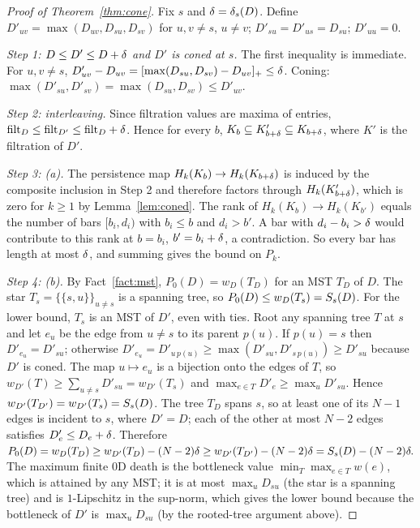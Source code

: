\begin{proof}[Proof of Theorem~\ref{thm:cone}]
Fix $s$ and $\delta=\delta_s(D)$. Define $D'_{uv}=\max(D_{uv},D_{su},D_{sv})$ for $u,v\ne s$, $u\ne v$; $D'_{su}=D'_{us}=D_{su}$; $D'_{uu}=0$.

\emph{Step 1: $D\le D'\le D+\delta$ and $D'$ is coned at $s$.} The first inequality is immediate. For $u,v\ne s$, $D'_{uv}-D_{uv}=[\max(D_{su},D_{sv})-D_{uv}]_+\le\delta$. Coning: $\max(D'_{su},D'_{sv})=\max(D_{su},D_{sv})\le D'_{uv}$.

\emph{Step 2: interleaving.} Since filtration values are maxima of entries, $\mathrm{filt}_D\le\mathrm{filt}_{D'}\le\mathrm{filt}_D+\delta$. Hence for every $b$, $K_b\subseteq K'_{b+\delta}\subseteq K_{b+\delta}$, where $K'$ is the filtration of $D'$.

\emph{Step 3: (a).} The persistence map $H_k(K_b)\to H_k(K_{b+\delta})$ is induced by the composite inclusion in Step 2 and therefore factors through $H_k(K'_{b+\delta})$, which is zero for $k\ge1$ by Lemma~\ref{lem:coned}. The rank of $H_k(K_b)\to H_k(K_{b'})$ equals the number of bars $[b_i,d_i)$ with $b_i\le b$ and $d_i>b'$. A bar with $d_i-b_i>\delta$ would contribute to this rank at $b=b_i$, $b'=b_i+\delta$, a contradiction. So every bar has length at most $\delta$, and summing gives the bound on $P_k$.

\emph{Step 4: (b).} By Fact~\ref{fact:mst}, $P_0(D)=w_D(T_D)$ for an MST $T_D$ of $D$. The star $T_s=\{\{s,u\}\}_{u\ne s}$ is a spanning tree, so $P_0(D)\le w_D(T_s)=S_s(D)$. For the lower bound, $T_s$ is an MST of $D'$, even with ties. Root any spanning tree $T$ at $s$ and let $e_u$ be the edge from $u\ne s$ to its parent $p(u)$. If $p(u)=s$ then $D'_{e_u}=D'_{su}$; otherwise $D'_{e_u}=D'_{u\,p(u)}\ge\max(D'_{su},D'_{s\,p(u)})\ge D'_{su}$ because $D'$ is coned. The map $u\mapsto e_u$ is a bijection onto the edges of $T$, so $w_{D'}(T)\ge\sum_{u\ne s}D'_{su}=w_{D'}(T_s)$ and $\max_{e\in T}D'_e\ge\max_u D'_{su}$. Hence $w_{D'}(T_{D'})=w_{D'}(T_s)=S_s(D)$. The tree $T_D$ spans $s$, so at least one of its $N-1$ edges is incident to $s$, where $D'=D$; each of the other at most $N-2$ edges satisfies $D'_e\le D_e+\delta$. Therefore
$P_0(D)=w_D(T_D)\ge w_{D'}(T_D)-(N-2)\delta\ge w_{D'}(T_{D'})-(N-2)\delta=S_s(D)-(N-2)\delta.$
The maximum finite $0$D death is the bottleneck value $\min_T\max_{e\in T}w(e)$, which is attained by any MST; it is at most $\max_u D_{su}$ (the star is a spanning tree) and is $1$-Lipschitz in the sup-norm, which gives the lower bound because the bottleneck of $D'$ is $\max_u D_{su}$ (by the rooted-tree argument above).


\end{proof}
